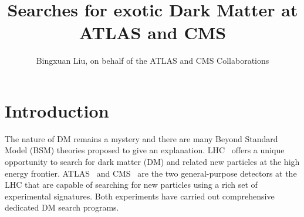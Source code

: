 \documentclass{moriond}
\begin{document}
\vspace*{0cm}
\title{Searches for exotic Dark Matter at ATLAS and CMS}


\author{Bingxuan Liu, on behalf of the ATLAS and CMS Collaborations}

\address{Department of Physics, Simon Fraser University, Vancouver, Canada}

\maketitle{}

\section{Introduction}

The nature of DM remains a mystery and there are many Beyond Standard Model
(BSM) theories proposed to give an explanation. LHC~\cite{LHCRef} offers a
unique opportunity to search for dark matter (DM) and related new particles at
the high energy frontier. ATLAS~\cite{ATLASRef} and CMS~\cite{CMSRef} are the
two general-purpose detectors at the LHC that are capable of searching for new
particles using a rich set of experimental signatures. Both experiments have carried out
comprehensive dedicated DM search programs.

\end{document}
